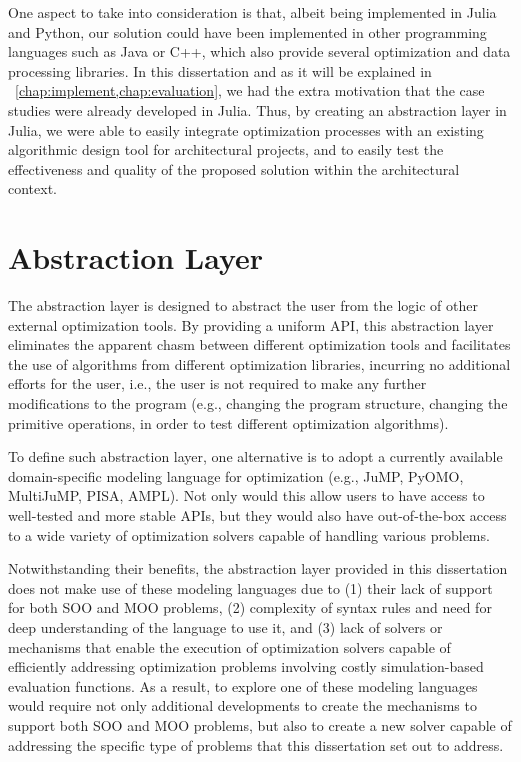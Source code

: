
One aspect to take into consideration is that, albeit being implemented in Julia and Python, our solution could have been implemented in other programming languages such as Java or C++, which also provide several optimization and data processing libraries. In this dissertation and as it will be explained in ~\cref{chap:implement,chap:evaluation}, we had the extra motivation that the case studies were already developed in Julia. Thus, by creating an abstraction layer in Julia, we were able to easily integrate optimization processes with an existing algorithmic design tool for architectural projects, and to easily test the effectiveness and quality of the proposed solution within the architectural context. 

\section{Abstraction Layer}
The abstraction layer is designed to abstract the user from the logic of other external optimization tools. By providing a uniform \ac{API}, this abstraction layer eliminates the apparent chasm between different optimization tools and facilitates the use of algorithms from different optimization libraries, incurring no additional efforts for the user, i.e., the user is not required to make any further modifications to the program (e.g., changing the program structure, changing the primitive operations, in order to test different optimization algorithms). 

To define such abstraction layer, one alternative is to adopt a currently available domain-specific modeling language for optimization (e.g., JuMP, PyOMO, MultiJuMP, PISA, AMPL). Not only would this allow users to have access to well-tested and more stable \acp{API}, but they would also have out-of-the-box access to a wide variety of optimization solvers capable of handling various problems. 

Notwithstanding their benefits, the abstraction layer provided in this dissertation does not make use of these modeling languages due to (1) their lack of support for both \ac{SOO} and \ac{MOO} problems, (2) complexity of syntax rules and need for deep understanding of the language to use it, and (3) lack of solvers or mechanisms that enable the execution of optimization solvers capable of efficiently addressing optimization problems involving costly simulation-based evaluation functions. As a result, to explore one of these modeling languages would require not only additional developments to create the mechanisms to support both \ac{SOO} and \ac{MOO} problems, but also to create a new solver capable of addressing the specific type of problems that this dissertation set out to address. 

